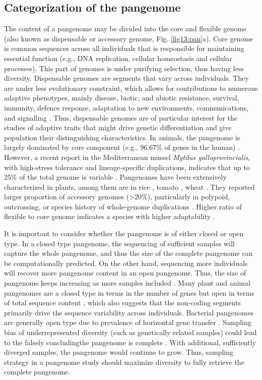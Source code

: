 \documentclass[../main.tex]{subfiles}
\begin{document}
\subsection{Categorization of the pangenome}

The content of a pangenome may be divided into the core and flexible genome (also known  as dispensable or accessory genome, Fig. \ref{fig13:pan}a). Core genome is common sequences across all individuals that is responsible for maintaining essential function (e.g., DNA replication, cellular homeostasis and cellular processes). This part of genomes is under purifying selection, thus having less diversity. Dispensable genomes are segments that vary across individuals. They are under less evolutionary constraint, which allows for contributions to numerous adaptive phenotypes, mainly disease, biotic, and abiotic resistance, survival, immunity, defence response, adaptation to new environments, communications, and signalling \citep{golicz2020pangenomics}. Thus, dispensable genomes are of particular interest for the studies of adaptive traits that might drive genetic differentiation and give population their distinguishing characteristics. In animals, the pangenome is largely dominated by core component (e.g., 96.67\% of genes in the human) \citep{duan2019hupan}. However, a recent report in the Mediterranean mussel \emph{Mytilus galloprovincialis}, with high-stress tolerance and lineage-specific duplications, indicates that up to 25\% of the total genome is variable \citep{gerdol2020massive}. Pangenomes have been extensively characterized in plants, among them are in rice \citep{zhao2018pan}, tomato \citep{gao2019tomato}, wheat \citep{walkowiak2020multiple}. They reported larger proportion of accessory genomes (>20\%), particularly in polypoid, outcrossing, or species history of whole-genome duplications \citep{tao2019exploring}. Higher ratio of flexible to core genome indicates a species with higher adaptability \citep{tranchant2018plant}. 

It is important to consider whether the pangenome is of either closed or open type. In a closed type pangenome, the sequencing of sufficient samples will capture the whole pangenome, and thus the size of the complete pangenome can be computationally predicted. On the other hand, sequencing more individuals will recover more pangenome content in an open pangenome. Thus, the size of pangenome keeps increasing as more samples included \citep{golicz2020pangenomics}. Many plant and animal pangenomes are a closed type in terms in the number of genes but open in terms of total sequence content \citep{duan2019hupan,golicz2020pangenomics}, which also suggests that the non-coding segments primarily drive the sequence variability across individuals. Bacterial pangenomes  are generally open type due to prevalence of horizontal gene transfer \citep{soucy2015horizontal}. Sampling bias of underrepresented diversity (such as genetically related samples) could lead to the falsely concludingthe pangenome is complete \citep{tranchant2018plant}. With additional, sufficiently  diverged samples, the  pangenome would continue to grow. Thus, sampling strategy in a pangenome study should maximize diversity to fully retrieve the complete pangenome. 
\end{document}
